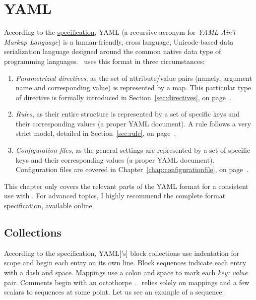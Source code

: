 \chapter{YAML}
\label{chap:yaml}

According to the \href{http://yaml.org/spec/1.2/spec.html}{specification}, \gls{YAML} (a recursive acronym for \emph{YAML Ain't Markup Language}) is a human-friendly, cross language, Unicode-based data serialization language designed around the common native data type of programming languages. \arara\ uses this format in three circumstances:

\begin{enumerate}
\item\emph{Parametrized directives}, as the set of attribute/value pairs (namely, argument name and corresponding value) is represented by a map. This particular type of directive is formally introduced in Section~\ref{sec:directives}, on page~\pageref{sec:directives}.

\item\emph{Rules}, as their entire structure is represented by a set of specific keys and their corresponding values (a proper \gls{YAML} document). A rule follows a very strict model, detailed in Section~\ref{sec:rule}, on page~\pageref{sec:rule}.

\item\emph{Configuration files}, as the general settings are represented by a set of specific keys and their corresponding values (a proper \gls{YAML} document). Configuration files are covered in Chapter~\ref{chap:configurationfile}, on page~\pageref{chap:configurationfile}.
\end{enumerate}

This chapter only covers the relevant parts of the \gls{YAML} format for a consistent use with \arara. For advanced topics, I highly recommend the complete format specification, available online.

\section{Collections}
\label{sec:yamlcollections}

According to the specification, \gls{YAML}['s] block collections use indentation for scope and begin each entry on its own line. Block sequences indicate each entry with a dash and space. Mappings use a colon and space to mark each \emph{key: value} pair. Comments begin with an octothorpe \rbox{\#}. \arara\ relies solely on mappings and a few scalars to sequences at some point. Let us see an example of a sequence:

